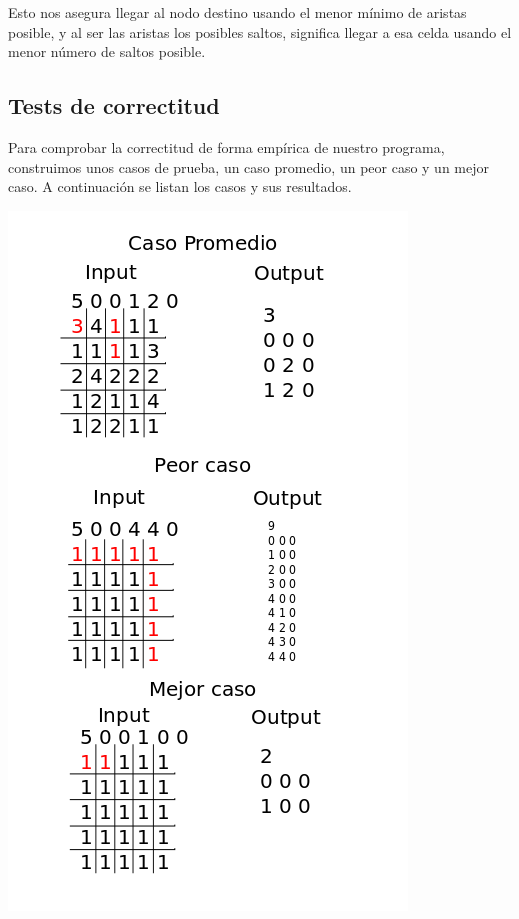 \vspace{2mm}

Esto nos asegura llegar al nodo destino usando el menor m\'inimo de aristas posible, y al ser las aristas los posibles saltos, significa llegar a esa celda usando el menor n\'umero de saltos posible.



\subsection{Tests de correctitud}

Para comprobar la correctitud de forma emp\'irica de nuestro programa, construimos unos casos de prueba, un caso promedio, un peor caso y un mejor caso. A continuaci\'on se listan los casos y sus resultados.

\begin{center}
\includegraphics[scale=0.6]{images/casosListed}
\end{center}


